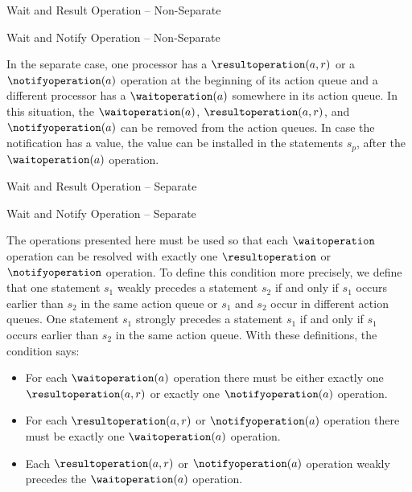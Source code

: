 \singlelineinferencerule
	{Wait and Result Operation -- Non-Separate}
	{}
	{}
	{}
 
\singlelineinferencerule
	{Wait and Notify Operation -- Non-Separate}
	{}
	{}
	{}
 
In the separate case, one processor has a $\resultoperation(a, r)$ or a $\notifyoperation(a)$ operation at the beginning of its action queue and a different processor has a $\waitoperation(a)$ somewhere in its action queue. In this situation, the $\waitoperation(a)$, $\resultoperation(a, r)$, and $\notifyoperation(a)$ can be removed from the action queues. In case the notification has a value, the value can be installed in the statements $s_{p}$, after the $\waitoperation(a)$ operation.

\singlelineinferencerule
	{Wait and Result Operation -- Separate}
	{}
	{}
	{}
 
\singlelineinferencerule
	{Wait and Notify Operation -- Separate}
	{}
	{}
	{}
 
The operations presented here must be used so that each $\waitoperation$ operation can be resolved with exactly one $\resultoperation$ or $\notifyoperation$ operation. To define this condition more precisely, we define that one statement $s_{1}$ weakly precedes a statement $s_{2}$ if and only if $s_{1}$ occurs earlier than $s_{2}$ in the same action queue or $s_{1}$ and $s_{2}$ occur in different action queues. One statement $s_{1}$ strongly precedes a statement $s_{1}$ if and only if $s_{1}$ occurs earlier than $s_{2}$ in the same action queue. With these definitions, the condition says:
\begin{itemize}
	\item For each $\waitoperation(a)$ operation there must be either exactly one $\resultoperation(a, r)$ or exactly one $\notifyoperation(a)$ operation.
	\item For each $\resultoperation(a, r)$ or $\notifyoperation(a)$ operation there must be exactly one $\waitoperation(a)$ operation.
	\item Each $\resultoperation(a, r)$ or $\notifyoperation(a)$ operation weakly precedes the $\waitoperation(a)$ operation.
\end{itemize}

